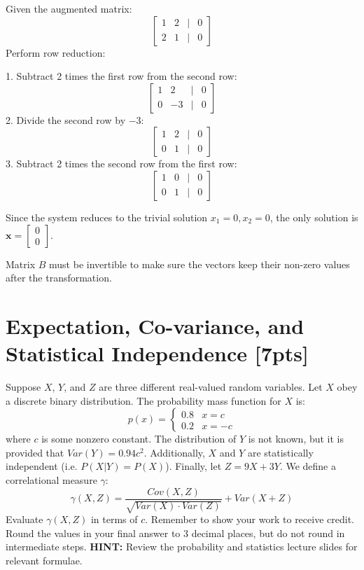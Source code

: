 \documentclass{article}
\begin{document}
\begin{enumerate}[label=(\alph*)]
    Given the augmented matrix:
\[ \begin{bmatrix} 1 & 2 & | & 0 \\ 2 & 1 & | & 0 \end{bmatrix} \]
Perform row reduction:

1. Subtract 2 times the first row from the second row:
   \[ \begin{bmatrix} 1 & 2 & | & 0 \\ 0 & -3 & | & 0 \end{bmatrix} \]
2. Divide the second row by $-3$:
   \[ \begin{bmatrix} 1 & 2 & | & 0 \\ 0 & 1 & | & 0 \end{bmatrix} \]
3. Subtract 2 times the second row from the first row:
   \[ \begin{bmatrix} 1 & 0 & | & 0 \\ 0 & 1 & | & 0 \end{bmatrix} \]

Since the system reduces to the trivial solution $x_1 = 0, x_2 = 0$, the only solution is $\boldsymbol{x} = \begin{bmatrix} 0 \\ 0 \end{bmatrix}$.

Matrix $B$ must be invertible to make sure the vectors keep their non-zero values after the transformation.

\end{enumerate}

\newpage



\section{Expectation, Co-variance, and Statistical Independence [7pts]}
Suppose $X$, $Y$, and $Z$ are three different real-valued random variables.
\bigbreak
\noindent Let $X$ obey a discrete binary distribution. The probability mass function for $X$ is:
$$p(x)=\begin{cases}
    0.8 & x = c\\
    0.2 & x = -c
\end{cases}$$
where $c$ is some nonzero constant. The distribution of $Y$ is not known, but it is provided that $Var(Y) = 0.94c^2$. Additionally, $X$ and $Y$ are statistically independent (i.e. $P(X|Y) = P(X)$). Finally, let $Z = 9X + 3Y$.
\bigbreak
\noindent We define a correlational measure $\gamma$:
$$\gamma(X,Z)=\frac{Cov(X,Z)}{\sqrt{Var(X)\cdot Var(Z)}} + Var(X+Z)$$
Evaluate $\gamma(X,Z)$ in terms of $c$. Remember to show your work to receive credit. Round the values in your final answer to 3 decimal places, but do not round in intermediate steps. 
\bigbreak
\noindent\textbf{HINT:} Review the probability and statistics lecture slides for relevant formulae.
\end{document}
